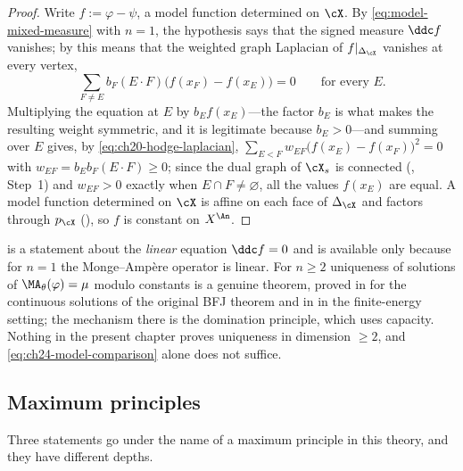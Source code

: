 \begin{proof}
Write $f:=\varphi-\psi$, a model function determined on $\cX$.  By
\eqref{eq:model-mixed-measure} with $n=1$, the hypothesis says that the
signed measure $\ddc f$ vanishes; by
 this means that the weighted graph
Laplacian of $f|_{\Delta_{\cX}}$ vanishes at every vertex,
\[
 \sum_{F\neq E}b_F(E\cdot F)\bigl(f(x_F)-f(x_E)\bigr)=0
 \qquad\text{for every }E .
\]
Multiplying the equation at $E$ by $b_Ef(x_E)$---the factor $b_E$ is
what makes the resulting weight symmetric, and it is legitimate because
$b_E>0$---and summing over $E$ gives, by
\eqref{eq:ch20-hodge-laplacian},
$\sum_{E<F}w_{EF}\bigl(f(x_E)-f(x_F)\bigr)^2=0$ with
$w_{EF}=b_Eb_F(E\cdot F)\geq0$; since the dual graph of $\cX_s$ is
connected (, Step~1) and $w_{EF}>0$ exactly when
$E\cap F\neq\varnothing$, all the values $f(x_E)$ are equal.  A model
function determined on $\cX$ is affine on each face of
$\Delta_{\cX}$ and factors through $p_{\cX}$
(), so $f$ is constant on $X^{\An}$.
\end{proof}

\begin{remark}
\label{rem:ch24-uniqueness-scope}
 is a statement about the
\emph{linear} equation $\ddc f=0$ and is available only because for
$n=1$ the Monge--Amp\`ere operator is linear.  For $n\geq2$ uniqueness of
solutions of $\MA_\theta(\varphi)=\mu$ modulo constants is a genuine
theorem, proved in  for the continuous solutions
of the original BFJ theorem and in  in
the finite-energy setting; the mechanism there is the domination principle,
which uses capacity.  Nothing in the present chapter proves uniqueness in
dimension $\geq2$, and \eqref{eq:ch24-model-comparison} alone does not
suffice.
\end{remark}

\subsection{Maximum principles}
\label{sec:ch24-max}

Three statements go under the name of a maximum principle in this theory,
and they have different depths.

